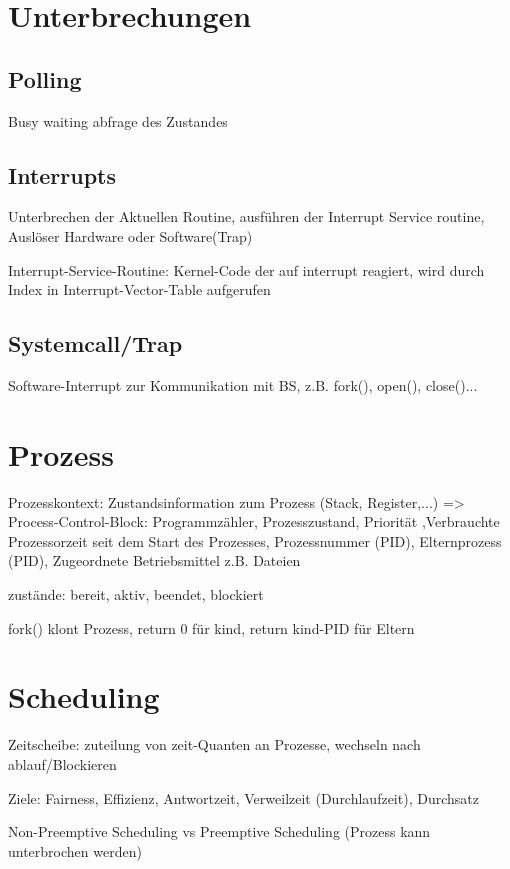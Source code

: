 \section*{Unterbrechungen}
\subsection*{Polling}
Busy waiting abfrage des Zustandes
\subsection*{Interrupts}
Unterbrechen der Aktuellen Routine, ausführen der Interrupt Service routine, Auslöser Hardware oder Software(Trap)

Interrupt-Service-Routine: Kernel-Code der auf interrupt reagiert, wird durch Index in Interrupt-Vector-Table aufgerufen

\subsection*{Systemcall/Trap}
Software-Interrupt zur Kommunikation mit BS, z.B. fork(), open(), close()...


\section*{Prozess}
Prozesskontext: Zustandsinformation zum Prozess (Stack, Register,...)
=> Process-Control-Block: Programmzähler, Prozesszustand, Priorität ,Verbrauchte Prozessorzeit seit dem Start des Prozesses, Prozessnummer (PID), Elternprozess (PID), Zugeordnete Betriebsmittel z.B. Dateien

zustände:
bereit, aktiv, beendet, blockiert 

fork() klont Prozess, return 0 für kind, return kind-PID für Eltern

\section*{Scheduling}
Zeitscheibe: zuteilung von zeit-Quanten an Prozesse, wechseln nach ablauf/Blockieren

Ziele: Fairness, Effizienz, Antwortzeit, Verweilzeit (Durchlaufzeit), Durchsatz

Non-Preemptive Scheduling vs Preemptive Scheduling (Prozess kann unterbrochen werden)

